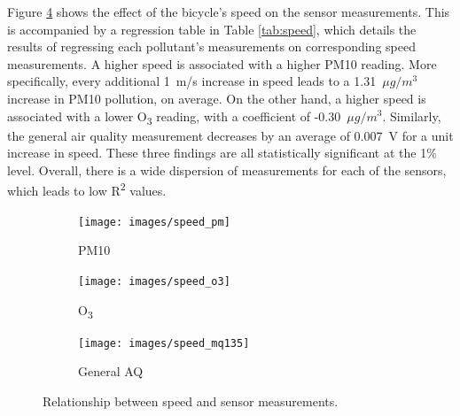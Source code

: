 \documentclass[11pt]{report}
\begin{document}
Figure \ref{fig:speed} shows the effect of the bicycle's speed on the sensor measurements. This is accompanied by a regression table in Table \ref{tab:speed}, which details the results of regressing each pollutant's measurements on corresponding speed measurements. A higher speed is associated with a higher PM10 reading. More specifically, every additional 1~m/s increase in speed leads to a 1.31~$\mu g/m^3$ increase in PM10 pollution, on average. On the other hand, a higher speed is associated with a lower O\textsubscript{3} reading, with a coefficient of -0.30~$\mu g/m^3$. Similarly, the general air quality measurement decreases by an average of 0.007~V for a unit increase in speed. These three findings are all statistically significant at the 1\% level. Overall, there is a wide dispersion of measurements for each of the sensors, which leads to low R\textsuperscript{2} values.

\begin{figure}[!tb]
    \centering
    \begin{minipage}{1\linewidth}
            \begin{subfigure}[t]{.32\linewidth}
                \texttt{[image: images/speed\_pm]}
                \caption{PM10}
                \label{fig:speed_pm10}
            \end{subfigure}
            \begin{subfigure}[t]{.32\linewidth}
            	\texttt{[image: images/speed\_o3]}
            	\caption{O\textsubscript{3}}
            	\label{fig:speed_o3}
	        \end{subfigure}
            \begin{subfigure}[t]{.32\linewidth}
                \texttt{[image: images/speed\_mq135]}
                \caption{General AQ}
                \label{fig:speed_mq135}
            \end{subfigure}
        \end{minipage}
    \caption[Relationship between speed and sensor measurements.]{Relationship between speed and sensor measurements.}
    \label{fig:speed}
\end{figure}

\end{document}
